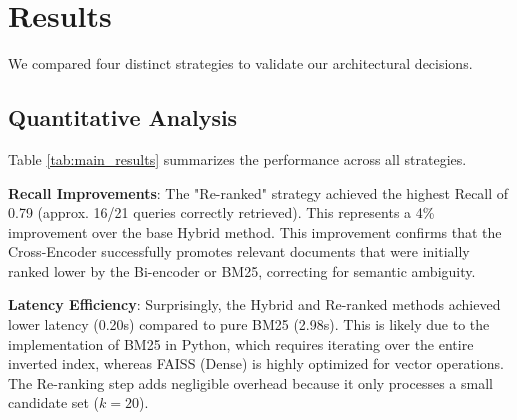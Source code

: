 \documentclass[11pt]{article}
\begin{document}
\section{Results}

We compared four distinct strategies to validate our architectural decisions.

\subsection{Quantitative Analysis}

Table \ref{tab:main_results} summarizes the performance across all strategies.

\begin{table}[h]
    \centering
    \caption{Performance comparison of Retrieval Strategies on the 21-query benchmark.}
    \label{tab:main_results}
\end{table}

\noindent \textbf{Recall Improvements}: The "Re-ranked" strategy achieved the highest Recall of 0.79 (approx. 16/21 queries correctly retrieved). This represents a 4\% improvement over the base Hybrid method. This improvement confirms that the Cross-Encoder successfully promotes relevant documents that were initially ranked lower by the Bi-encoder or BM25, correcting for semantic ambiguity.

\noindent \textbf{Latency Efficiency}: Surprisingly, the Hybrid and Re-ranked methods achieved lower latency (0.20s) compared to pure BM25 (2.98s). This is likely due to the implementation of BM25 in Python, which requires iterating over the entire inverted index, whereas FAISS (Dense) is highly optimized for vector operations. The Re-ranking step adds negligible overhead because it only processes a small candidate set ($k=20$).
\end{document}

